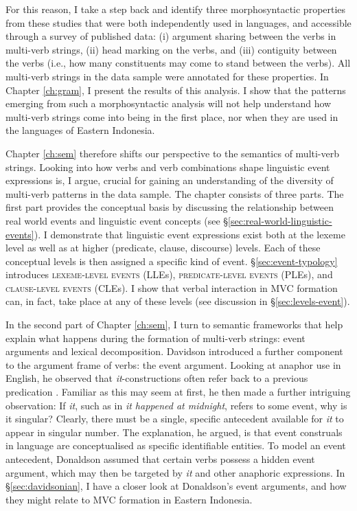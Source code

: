 For this reason, I take a step back and identify three morphosyntactic properties from these studies that were both independently used in languages, and accessible through a survey of published data: (i) argument sharing between the verbs in multi-verb strings, (ii) head marking on the verbs, and (iii) contiguity between the verbs (i.e., how many constituents may come to stand between the verbs). All multi-verb strings in the data sample were annotated for these properties. In Chapter \ref{ch:gram}, I present the results of this analysis. I show that the patterns emerging from such a morphosyntactic analysis will not help understand how multi-verb strings come into being in the first place, nor when they are used in the languages of Eastern Indonesia.

Chapter \ref{ch:sem} therefore shifts our perspective to the semantics of multi-verb strings. Looking into how verbs and verb combinations shape linguistic event expressions is, I argue, crucial for gaining an understanding of the diversity of multi-verb patterns in the data sample. The chapter consists of three parts. The first part provides the conceptual basis by discussing the relationship between real world events and linguistic event concepts (see §\ref{sec:real-world-linguistic-events}). I demonstrate that linguistic event expressions exist both at the lexeme level as well as at higher (predicate, clause, discourse) levels. Each of these conceptual levels is then assigned a specific kind of event. §\ref{sec:event-typology} introduces \textsc{lexeme-level events} (LLEs), \textsc{predicate-level events} (PLEs), and \textsc{clause-level events} (CLEs). I show that verbal interaction in MVC formation can, in fact, take place at any of these levels (see discussion in §\ref{sec:levels-event}). 

In the second part of Chapter \ref{ch:sem}, I turn to semantic frameworks that help explain what happens during the formation of multi-verb strings: event arguments and lexical decomposition. Davidson introduced a further component to the argument frame of verbs: the event argument. Looking at anaphor use in English, he observed that \textit{it}-constructions often refer back to a previous predication \citep{davidson1967logical}. Familiar as this may seem at first, he then made a further intriguing observation: If \textit{it}, such as in \textit{it happened at midnight}, refers to some event, why is it singular? Clearly, there must be a single, specific antecedent available for \textit{it} to appear in singular number. The explanation, he argued, is that event construals in language are conceptualised as specific identifiable entities. To model an event antecedent, Donaldson assumed that certain verbs possess a hidden event argument, which may then be targeted by \textit{it} and other anaphoric expressions. In §\ref{sec:davidsonian}, I have a closer look at Donaldson's event arguments, and how they might relate to MVC formation in Eastern Indonesia. 

